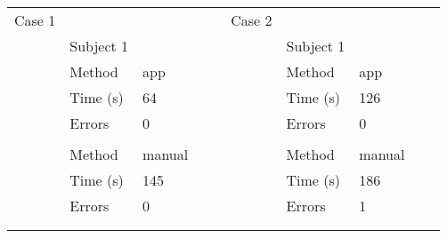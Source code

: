 \begin{table}[!ht]
\centering
\begin{tabular}{l|l|l|lll|l|l|ll}
\multicolumn{1}{l}{Case 1} & \multicolumn{1}{l}{}          & \multicolumn{1}{l}{} &  &  & \multicolumn{1}{l}{Case 2} & \multicolumn{1}{l}{}          & \multicolumn{1}{l}{} &  &   \\ 
\cline{2-3}\cline{7-8}
                           & \multicolumn{1}{l}{Subject 1} &                      &  &  &                            & \multicolumn{1}{l}{Subject 1} &                      &  &   \\ 
\cline{2-3}\cline{7-8}
                           & Method                        & app                  &  &  &                            & Method                        & app                  &  &   \\ 
\cline{2-3}\cline{7-8}
                           & Time (s)                      & 64                   &  &  &                            & Time (s)                      & 126                  &  &   \\ 
\cline{2-3}\cline{7-8}
                           & Errors                        & 0                    &  &  &                            & Errors                        & 0                    &  &   \\ 
\cline{2-3}\cline{7-8}
                           &                               &                      &  &  &                            &                               &                      &  &   \\ 
\cline{2-3}\cline{7-8}
                           & Method                        & manual               &  &  &                            & Method                        & manual               &  &   \\ 
\cline{2-3}\cline{7-8}
                           & Time (s)                      & 145                  &  &  &                            & Time (s)                      & 186                  &  &   \\ 
\cline{2-3}\cline{7-8}
                           & Errors                        & 0                    &  &  &                            & Errors                        & 1                    &  &   \\ 
\cline{2-3}\cline{7-8}
\multicolumn{1}{l}{}       & \multicolumn{1}{l}{}          & \multicolumn{1}{l}{} &  &  & \multicolumn{1}{l}{}       & \multicolumn{1}{l}{}          & \multicolumn{1}{l}{} &  &   \\
\multicolumn{1}{l}{}       & \multicolumn{1}{l}{}          & \multicolumn{1}{l}{} &  &  & \multicolumn{1}{l}{}       & \multicolumn{1}{l}{}          & \multicolumn{1}{l}{} &  &   \\ 

\end{tabular}
\end{table}
